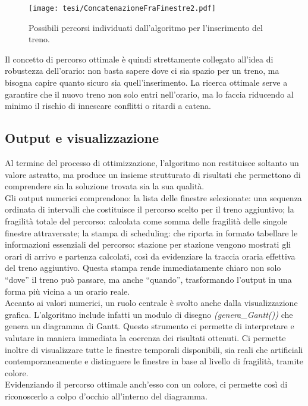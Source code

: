 \documentclass{report}
\begin{document}
\begin{figure}[H]
    \centering
    \texttt{[image: tesi/ConcatenazioneFraFinestre2.pdf]}
    \caption{Possibili percorsi individuati dall'algoritmo per l'inserimento del treno.}
    \label{fig:placeholder}
\end{figure}

Il concetto di percorso ottimale è quindi strettamente collegato all’idea di robustezza dell’orario: non basta sapere dove ci sia spazio per un treno, ma bisogna capire quanto sicuro sia quell’inserimento. La ricerca ottimale serve a garantire che il nuovo treno non solo entri nell’orario, ma lo faccia riducendo al minimo il rischio di innescare conflitti o ritardi a catena.

\subsection{Output e visualizzazione}
Al termine del processo di ottimizzazione, l’algoritmo non restituisce soltanto un valore astratto, ma produce un insieme strutturato di risultati che permettono di comprendere sia la soluzione trovata sia la sua qualità. \\ Gli output numerici comprendono: la lista delle finestre selezionate: una sequenza ordinata di intervalli che costituisce il percorso scelto per il treno aggiuntivo; la fragilità totale del percorso: calcolata come somma delle fragilità delle singole finestre attraversate; la stampa di scheduling: che riporta in formato tabellare le informazioni essenziali del percorso: stazione per stazione vengono mostrati gli orari di arrivo e partenza calcolati, così da evidenziare la traccia oraria effettiva del treno aggiuntivo. Questa stampa rende immediatamente chiaro non solo “dove” il treno può passare, ma anche “quando”, trasformando l’output in una forma più vicina a un orario reale. \\ Accanto ai valori numerici, un ruolo centrale è svolto anche dalla visualizzazione grafica. L’algoritmo include infatti un modulo di disegno \textit{(genera\_Gantt())} che genera un diagramma di Gantt.
    Questo strumento ci permette di interpretare e valutare in maniera immediata la coerenza dei risultati ottenuti.
    Ci permette inoltre di visualizzare tutte le finestre temporali disponibili, sia reali che artificiali contemporaneamente e distinguere le finestre in base al livello di fragilità, tramite colore. \\ Evidenziando il percorso ottimale anch'esso con un colore, ci permette così di riconoscerlo a colpo d’occhio all’interno del diagramma.
\end{document}

